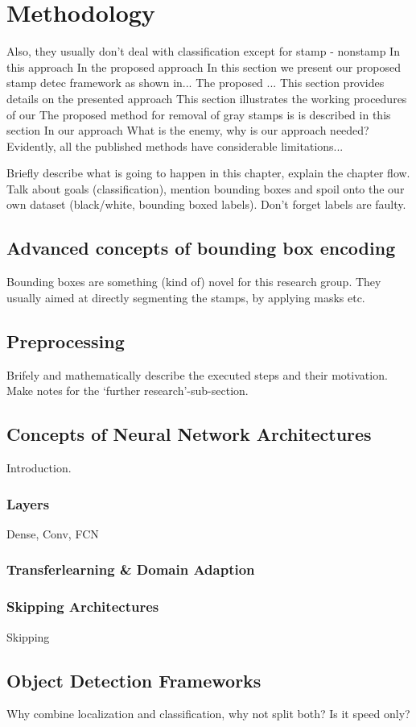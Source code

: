 \chapter{Methodology}\label{chap:Methodology}


Also, they usually don't deal with classification except for stamp - nonstamp
In this approach 
In the proposed approach 
In this section we present our proposed stamp detec framework as shown in...
The proposed ...
This section provides details on the presented approach
This section illustrates the working procedures of our
The proposed method for removal of gray stamps is is described in this section
In our approach
What is the enemy, why is our approach needed?
Evidently, all the published methods have considerable limitations...





Briefly describe what is going to happen in this chapter, explain the chapter 
flow. Talk about goals (classification), mention bounding boxes and spoil onto 
the our own dataset (black/white, bounding boxed labels). Don't forget labels
are faulty.\\
\blindtext[2]

\section{Advanced concepts of bounding box encoding}
Bounding boxes are something (kind of) novel for this research group. They 
usually aimed at directly segmenting the stamps, by applying masks etc.


\section{Preprocessing}
Brifely and mathematically describe the executed steps and their motivation.
Make notes for the `further research'-sub-section.
\blindtext[2]

\section{Concepts of Neural Network Architectures}
Introduction.
\blindtext[1]


\subsection{Layers}
Dense, Conv, FCN
\blindtext[1]

\subsection{Transferlearning \& Domain Adaption}
\blindtext[1]


\subsection{Skipping Architectures}
Skipping
\blindtext[1]

\section{Object Detection Frameworks}
Why combine localization and classification, why not split both? Is it speed 
only?
\blindtext[3]